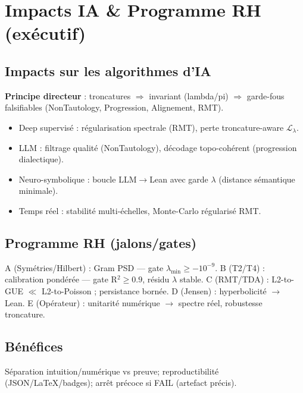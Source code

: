 \documentclass[11pt]{article}
\begin{document}
\section*{Impacts IA \& Programme RH (ex\'ecutif)}
\subsection*{Impacts sur les algorithmes d'IA}
\textbf{Principe directeur} : troncatures $\Rightarrow$ invariant (lambda/pi) $\Rightarrow$ garde-fous falsifiables (NonTautology, Progression, Alignement, RMT).
\begin{itemize}
  \item Deep supervis\'e : r\'egularisation spectrale (RMT), perte troncature-aware $\mathcal{L}_\lambda$.
  \item LLM : filtrage qualit\'e (NonTautology), d\'ecodage topo-coh\'erent (progression dialectique).
  \item Neuro-symbolique : boucle LLM$\to$Lean avec garde $\lambda$ (distance s\'emantique minimale).
  \item Temps r\'eel : stabilit\'e multi-\'echelles, Monte-Carlo r\'egularis\'e RMT.
\end{itemize}
\subsection*{Programme RH (jalons/gates)}
A (Sym\'etries/Hilbert) : Gram PSD --- gate $\lambda_{\min}\ge -10^{-9}$.
B (T2/T4) : calibration pond\'er\'ee --- gate R$^2\ge 0.9$, r\'esidu $\lambda$ stable.
C (RMT/TDA) : L2-to-GUE $\ll$ L2-to-Poisson ; persistance born\'ee.
D (Jensen) : hyperbolicit\'e $\to$ Lean.
E (Op\'erateur) : unitarit\'e num\'erique $\to$ spectre r\'eel, robustesse troncature.
\subsection*{B\'en\'efices}
S\'eparation intuition/num\'erique vs preuve; reproductibilit\'e (JSON/LaTeX/badges); arr\^et pr\'ecoce si FAIL (artefact pr\'ecis).
\end{document}

